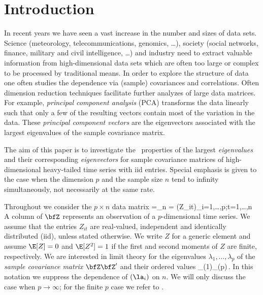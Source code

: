 \section{Introduction}\label{sec:motivation}
In recent years we have seen a vast increase in the number and sizes of data sets. 
Science  (meteorology, telecommunications, genomics, \ldots), society (social networks, finance, military and civil intelligence, \ldots) and industry 
need to extract valuable information from high-dimensional data sets
which are often too large or 
complex to be processed by traditional means. 
In order to explore the structure of data one often studies the dependence via 
(sample) covariances and correlations. %
Often dimension reduction techniques facilitate further analyzes of large data matrices. For example, 
{\em principal component analysis}  (PCA) transforms the data linearly such that only a few of the resulting vectors 
contain most of the variation in the data. These {\em principal component vectors} 
are the eigenvectors associated with the largest eigenvalues of the sample covariance matrix.
\par 
The aim of this paper is to investigate the \asy\ properties of the 
largest {\em eigenvalues} and their corresponding {\em eigenvectors} for
sample covariance matrices of high-dimensional heavy-tailed time series with iid entries.
Special emphasis is given to the case 
when the dimension $p$ and the sample size $n$ tend to infinity simultaneously, not necessarily at the same rate. 
\par
Throughout we consider the $p\times n$ data matrix 
\beao
\bfZ =\bfZ_n = \big(Z_{it}\big)_{i=1,\ldots,p;t=1,\ldots,n}\,
\eeao
A column of $\bfZ$ represents an observation of a $p$-dimensional time series.
We assume that the entries $Z_{it}$ are real-valued, independent and identically distributed (iid), 
unless stated otherwise. We write $Z$ for a generic element and assume $\E[Z]=0$ and $\E [Z^2]=1$ 
if the first and second moments of $Z$ are finite, respectively.
We are interested in limit theory for the eigenvalues $\lambda_1,\ldots,\lambda_p$ of the {\em sample covariance matrix} $\bfZ\bfZ'$
and their ordered values 
\beam\label{eq:order}
\la_{(1)}\ge \cdots \ge \la_{(p)}\,.
\eeam
In this notation we suppress 
the dependence of $(\la_i)$ on $n$. We will only discuss the case when $p \to \infty$; for the finite $p$ case 
we refer to \cite{anderson:1963,muirhead}.

